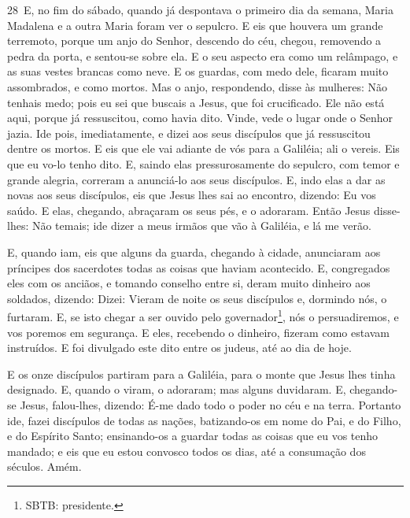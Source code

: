 \medskip

\lettrine{28}\ E, no fim do sábado, quando já despontava o
primeiro dia da semana, Maria Madalena e a outra Maria foram ver o
sepulcro. E eis que houvera um grande terremoto, porque um anjo
do Senhor, descendo do céu, chegou, removendo a pedra da porta, e
sentou-se sobre ela. E o seu aspecto era como um relâmpago, e as
suas vestes brancas como neve. E os guardas, com medo dele,
ficaram muito assombrados, e como mortos. Mas o anjo,
respondendo, disse às mulheres: Não tenhais medo; pois eu sei que
buscais a Jesus, que foi crucificado. Ele não está aqui, porque
já ressuscitou, como havia dito. Vinde, vede o lugar onde o Senhor
jazia. Ide pois, imediatamente, e dizei aos seus discípulos que
já ressuscitou dentre os mortos. E eis que ele vai adiante de vós
para a Galiléia; ali o vereis. Eis que eu vo-lo tenho dito. E,
saindo elas pressurosamente do sepulcro, com temor e grande alegria,
correram a anunciá-lo aos seus discípulos. E, indo elas a dar as
novas aos seus discípulos, eis que Jesus lhes sai ao encontro,
dizendo: Eu vos saúdo. E elas, chegando, abraçaram os seus pés, e o
adoraram. Então Jesus disse-lhes: Não temais; ide dizer a
meus irmãos que vão à Galiléia, e lá me verão.

E, quando iam, eis que alguns da guarda, chegando à cidade,
anunciaram aos príncipes dos sacerdotes todas as coisas que haviam
acontecido. E, congregados eles com os anciãos, e tomando
conselho entre si, deram muito dinheiro aos soldados,
dizendo: Dizei: Vieram de noite os seus discípulos e,
dormindo nós, o furtaram. E, se isto chegar a ser ouvido pelo
governador\footnote{SBTB: presidente.}, nós o persuadiremos, e vos
poremos em segurança. E eles, recebendo o dinheiro, fizeram
como estavam instruídos. E foi divulgado este dito entre os judeus,
até ao dia de hoje.

E os onze discípulos partiram para a Galiléia, para o monte que
Jesus lhes tinha designado. E, quando o viram, o adoraram;
mas alguns duvidaram. E, chegando-se Jesus, falou-lhes,
dizendo:  É-me dado todo o poder no céu e na terra. Portanto
ide, fazei discípulos de todas as nações, batizando-os em nome do
Pai, e do Filho, e do Espírito Santo; ensinando-os a guardar
todas as coisas que eu vos tenho mandado; e eis que eu estou
convosco todos os dias, até a consumação dos séculos. Amém.



